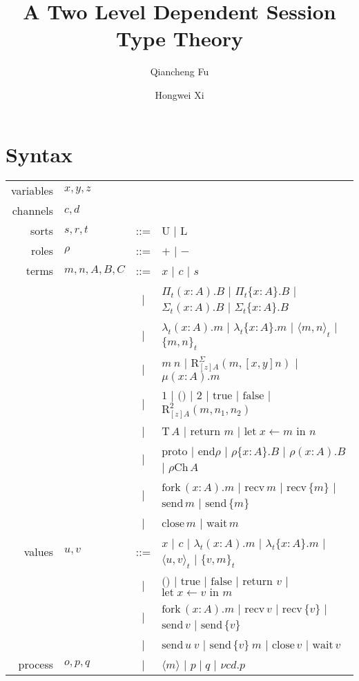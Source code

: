\documentclass{article}
\title{A Two Level Dependent Session Type Theory}
\author[1]{Qiancheng Fu}
\author[1]{Hongwei Xi}
\affil[1]{Boston University}
\newcommand{\Un}{\text{U}}
\newcommand{\Ln}{\text{L}}
\newcommand{\PiR}[3]{\Pi_{#1}({#2}).{#3}}
\newcommand{\PiI}[3]{\Pi_{#1}\{{#2}\}.{#3}}
\newcommand{\lamR}[3]{\lambda_{#1}({#2}).{#3}}
\newcommand{\lamI}[3]{\lambda_{#1}\{{#2}\}.{#3}}
\newcommand{\SigR}[3]{\Sigma_{#1}({#2}).{#3}}
\newcommand{\SigI}[3]{\Sigma_{#1}\{{#2}\}.{#3}}
\newcommand{\pairR}[3]{\langle{{#1},{#2}}\rangle_{#3}}
\newcommand{\pairI}[3]{\{{#1},{#2}\}_{#3}}
\newcommand{\SigElim}[3]{\text{R}_{#1}^{\Sigma}({#2},{#3})}
\newcommand{\fix}[2]{\mu({#1}).{#2}}
\newcommand{\unit}{\text{1}}
\newcommand{\ii}{\text{()}}
\newcommand{\bool}{\text{2}}
\newcommand{\btrue}{\text{true}}
\newcommand{\bfalse}{\text{false}}
\newcommand{\boolElim}[4]{\text{R}_{#1}^{\bool}({#2},{#3},{#4})}
\newcommand{\T}[1]{\text{T}\,{#1}}
\newcommand{\return}[1]{\text{return }{#1}}
\newcommand{\letin}[3]{\text{let}\;{#1}\leftarrow{#2}\text{ in }{#3}}
\newcommand{\proto}{\text{proto}}
\newcommand{\protoEnd}[1]{\text{end}{#1}}
\newcommand{\actI}[3]{{#1}\{{#2}\}.{#3}}
\newcommand{\actR}[3]{{#1}({#2}).{#3}}
\newcommand{\Ch}[2]{{#1}\text{Ch}\,{#2}}
\newcommand{\fork}[2]{\text{fork}\,({#1}).{#2}}
\newcommand{\recvI}[1]{\text{recv}\,\{{#1}\}}
\newcommand{\recvR}[1]{\text{recv}\,{#1}}
\newcommand{\sendI}[1]{\text{send}\,\{{#1}\}}
\newcommand{\sendR}[1]{\text{send}\,{#1}}
\newcommand{\close}[1]{\text{close}\,{#1}}
\newcommand{\wait}[1]{\text{wait}\,{#1}}
\newcommand{\scope}[2]{\nu{#1}.{#2}}
\begin{document}
\maketitle

\section{Syntax}
\begin{center}
  \begin{tabular}{r l c l}
    variables & $x, y, z$   &     &               \\
    channels  & $c, d$      &     &               \\
    sorts     & $s, r, t$   & ::= & $\Un$ | $\Ln$ \\
    roles     & $\rho$      & ::= & $+$ | $-$ \\
    terms     & $m,n,A,B,C$ & ::= & $x$ | $c$ | $s$ \\
              &             & \;| & $\PiR{t}{x : A}{B}$ | $\PiI{t}{x : A}{B}$
                                    | $\SigR{t}{x : A}{B}$ | $\SigI{t}{x : A}{B}$ \\
              &             & \;| & $\lamR{t}{x : A}{m}$ | $\lamI{t}{x : A}{m}$
                                    | $\pairR{m}{n}{t}$ | $\pairI{m}{n}{t}$ \\
              &             & \;| & $m\ n$ | $\SigElim{[z]A}{m}{[x,y]n}$ | $\fix{x : A}{m}$ \\
              &             & \;| & $\unit$ | $\ii$ | $\bool$ | $\btrue$ | $\bfalse$
                                    | $\boolElim{[z]A}{m}{n_{1}}{n_{2}}$ \\
              &             & \;| & $\T{A}$ | $\return{m}$ | $\letin{x}{m}{n}$ \\
              &             & \;| & $\proto$ | $\protoEnd{\rho}$
                                    | $\actI{\rho}{x : A}{B}$ | $\actR{\rho}{x : A}{B}$ | $\Ch{\rho}{A}$ \\
              &             & \;| & $\fork{x : A}{m}$ | $\recvR{m}$ | $\recvI{m}$
                                    | $\sendR{m}$ | $\sendI{m}$ \\
              &             & \;| & $\close{m}$ | $\wait{m}$ \\
    values    & $u, v$      & ::= & $x$ | $c$ | $\lamR{t}{x : A}{m}$ | $\lamI{t}{x : A}{m}$
                                    | $\pairR{u}{v}{t}$ | $\pairI{v}{m}{t}$ \\
              &             & \;| & $\ii$ | $\btrue$ | $\bfalse$ | $\return{v}$ | $\letin{x}{v}{m}$ \\
              &             & \;| & $\fork{x : A}{m}$ | $\recvR{v}$ | $\recvI{v}$ | $\sendR{v}$ | $\sendI{v}$ \\
              &             & \;| & $\sendR{u}\ v$ | $\sendI{v}\ m$ | $\close{v}$ | $\wait{v}$ \\
    process   & $o, p, q$   & \;| & $\langle m \rangle$ | $p \mid q$ | $\scope{cd}{p}$
  \end{tabular}
\end{center}
\end{document}
